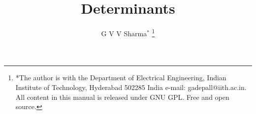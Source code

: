 \documentclass[journal,12pt,twocolumn]{IEEEtran}
\begin{document}
\let\StandardTheFigure\thefigure
\let\vec\mathbf
\renewcommand{\thefigure}{\theproblem}



\def\putbox#1#2#3{\makebox[0in][l]{\makebox[#1][l]{}\raisebox{\baselineskip}[0in][0in]{\raisebox{#2}[0in][0in]{#3}}}}
     \def\rightbox#1{\makebox[0in][r]{#1}}
     \def\centbox#1{\makebox[0in]{#1}}
     \def\topbox#1{\raisebox{-\baselineskip}[0in][0in]{#1}}
     \def\midbox#1{\raisebox{-0.5\baselineskip}[0in][0in]{#1}}

\vspace{3cm}

\title{
Determinants
}
\author{ G V V Sharma$^{*}$%
	\thanks{*The author is with the Department
		of Electrical Engineering, Indian Institute of Technology, Hyderabad
		502285 India e-mail:  gadepall@iith.ac.in. All content in this manual is released under GNU GPL.  Free and open source.}
	
}	


%
%
%

% 
%
\end{document}
